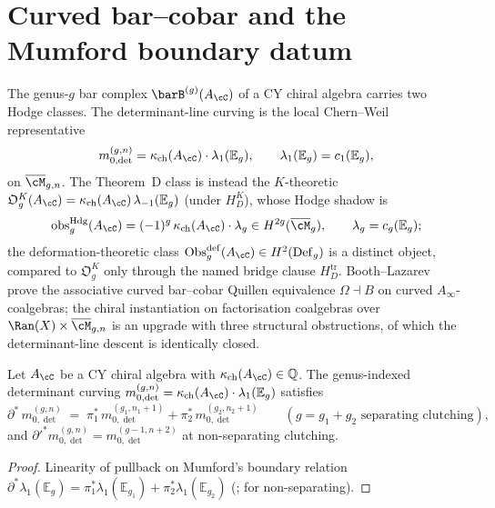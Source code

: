 \section{Curved bar--cobar and the Mumford boundary datum}
\label{sec:curved-bar-cobar-mumford}

The genus-$g$ bar complex $\barB^{(g)}(A_\cC)$ of a CY chiral algebra carries
two Hodge classes. The determinant-line curving is the local
Chern--Weil representative
\[
m_{0,\det}^{(g,n)}
=\kappa_{\mathrm{ch}}(A_\cC)\cdot\lambda_1(\mathbb{E}_g),
\qquad
\lambda_1(\mathbb{E}_g)=c_1(\mathbb{E}_g),
\]
on $\overline{\cM}_{g,n}$. The Theorem~D class is instead the
$K$-theoretic $\mathfrak{O}_g^K(A_\cC)
=\kappa_{\mathrm{ch}}(A_\cC)\,\lambda_{-1}(\mathbb{E}_g)$
(under $H_D^K$), whose Hodge shadow is
\[
\mathrm{obs}^{\mathrm{Hdg}}_g(A_\cC)
=(-1)^g\,\kappa_{\mathrm{ch}}(A_\cC)\cdot\lambda_g
\in H^{2g}(\overline{\cM}_g),
\qquad
\lambda_g=c_g(\mathbb{E}_g);
\]
the deformation-theoretic class
$\operatorname{Obs}^{\mathrm{def}}_g(A_\cC)\in H^2(\operatorname{Def}_g)$
is a distinct object, compared to $\mathfrak{O}_g^K$ only through the
named bridge clause $H_D^{\mathrm{tr}}$.
Booth--Lazarev~\cite{BoothLazarev23} prove the associative curved
bar--cobar Quillen equivalence $\Omega\dashv B$ on curved
$A_\infty$-coalgebras; the chiral instantiation on factorisation
coalgebras over $\Ran(X)\times\overline{\cM}_{g,n}$ is an upgrade with
three structural obstructions, of which the determinant-line descent is
identically closed.

\begin{proposition}
\label{prop:kappa-ch-boundary-descent}
Let $A_\cC$ be a CY chiral algebra with $\kappa_{\mathrm{ch}}(A_\cC)\in\mathbb{Q}$.
The genus-indexed determinant curving
$m_{0,\det}^{(g,n)} = \kappa_{\mathrm{ch}}(A_\cC)\cdot
\lambda_1(\mathbb{E}_g)$ satisfies
\[
\partial^*\, m_{0,\det}^{(g,n)} \;=\; \pi_1^*\, m_{0,\det}^{(g_1,n_1+1)}+\pi_2^*\,
 m_{0,\det}^{(g_2,n_2+1)}
\qquad (g=g_1+g_2\text{ separating clutching}),
\]
and $\partial'^* m_{0,\det}^{(g,n)} = m_{0,\det}^{(g-1,n+2)}$ at non-separating clutching.
\end{proposition}

\begin{proof}
Linearity of pullback on Mumford's boundary relation
$\partial^*\lambda_1(\mathbb{E}_g) =
\pi_1^*\lambda_1(\mathbb{E}_{g_1})+\pi_2^*\lambda_1(\mathbb{E}_{g_2})$
(\cite{Mumford1983}; \cite{TeixidorBigas1988} for non-separating).
\end{proof}

